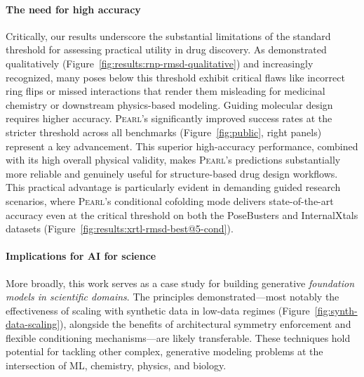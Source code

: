 \documentclass[11pt, letterpaper, onecolumn]{tau-class/tau}
\newcommand{\pearl}{\textsc{Pearl}\xspace}
\newcommand{\rmsdonea}{\text{RMSD\,\raisebox{0.25ex}{\scriptsize <}\,1\,\AA}\xspace}
\newcommand{\rmsdtwoa}{\text{RMSD\,\raisebox{0.25ex}{\scriptsize <}\,2\,\AA}\xspace}
\newcommand{\posebusters}{PoseBusters\xspace}
\newcommand{\internalxtals}{InternalXtals\xspace}
\let\oldAA\AA
\renewcommand{\AA}{\oldAA\xspace}
\begin{document}
\paragraph{The need for high accuracy}
Critically, our results underscore the substantial limitations of the standard \rmsdtwoa threshold for assessing practical utility in drug discovery.
As demonstrated qualitatively (Figure~\ref{fig:results:rnp-rmsd-qualitative}) and increasingly recognized, many poses below this threshold exhibit critical flaws like incorrect ring flips or missed interactions that render them misleading for medicinal chemistry or downstream physics-based modeling. Guiding molecular design requires higher accuracy.
\pearl's significantly improved success rates at the stricter \rmsdonea threshold across all benchmarks (Figure~\ref{fig:public}, right panels) represent a key advancement.
This superior high-accuracy performance, combined with its high overall physical validity, makes \pearl's predictions substantially more reliable and genuinely useful for structure-based drug design workflows.
This practical advantage is particularly evident in demanding guided research scenarios, where \pearl's conditional cofolding mode delivers state-of-the-art accuracy even at the critical \rmsdonea threshold on both the \posebusters and \internalxtals datasets (Figure~\ref{fig:results:xrtl-rmsd-best@5-cond}).

\paragraph{Implications for AI for science} More broadly, this work serves as a case study for building generative \textit{foundation models in scientific domains}. The principles demonstrated---most notably the effectiveness of scaling with synthetic data in low-data regimes (Figure~\ref{fig:synth-data-scaling}), alongside the benefits of architectural symmetry enforcement and flexible conditioning mechanisms---are likely transferable. These techniques hold potential for tackling other complex, generative modeling problems at the intersection of ML, chemistry, physics, and biology.
\end{document}
